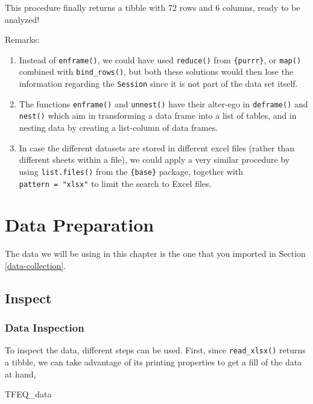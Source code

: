 \documentclass[
]{book}
\newenvironment{Shaded}{\begin{snugshade}}{\end{snugshade}}
\newcommand{\NormalTok}[1]{#1}
\providecommand{\tightlist}{%
  \setlength{\itemsep}{0pt}\setlength{\parskip}{0pt}}
\begin{document}
This procedure finally returns a tibble with 72 rows and 6 columns, ready to be analyzed!

Remarks:

\begin{enumerate}
\def\labelenumi{\arabic{enumi}.}
\tightlist
\item
  Instead of \texttt{enframe()}, we could have used \texttt{reduce()} from \texttt{\{purrr\}}, or \texttt{map()} combined with \texttt{bind\_rows()}, but both these solutions would then lose the information regarding the \texttt{Session} since it is not part of the data set itself.
\item
  The functions \texttt{enframe()} and \texttt{unnest()} have their alter-ego in \texttt{deframe()} and \texttt{nest()} which aim in transforming a data frame into a list of tables, and in nesting data by creating a list-column of data frames.
\item
  In case the different datasets are stored in different excel files (rather than different sheets within a file), we could apply a very similar procedure by using \texttt{list.files()} from the \texttt{\{base\}} package, together with \texttt{pattern\ =\ "xlsx"} to limit the search to Excel files.
\end{enumerate}

\hypertarget{data-prep}{%
\chapter{Data Preparation}\label{data-prep}}

The data we will be using in this chapter is the one that you imported in Section \ref{data-collection}.

\hypertarget{inspect}{%
\section{Inspect}\label{inspect}}

\hypertarget{data-inspection}{%
\subsection{Data Inspection}\label{data-inspection}}

To inspect the data, different steps can be used.
First, since \texttt{read\_xlsx()} returns a tibble, we can take advantage of its printing properties to get a fill of the data at hand,

\begin{Shaded}
\begin{Highlighting}[]
\NormalTok{TFEQ\_data}
\end{Highlighting}
\end{Shaded}
\end{document}
